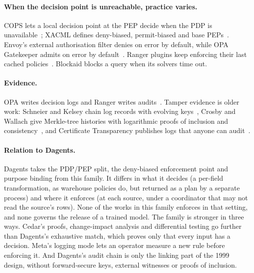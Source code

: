 \paragraph{When the decision point is unreachable, practice varies.} COPS lets a
local decision point at the PEP decide when the PDP is
unavailable~\citep{boyle2000cops}; XACML defines deny-biased, permit-biased and
base PEPs~\citep{oasis2013xacml}. Envoy's external authorisation filter denies
on error by default, while OPA Gatekeeper admits on error by
default~\citep{envoy2026extauthz,gatekeeper2026failing}. Ranger plugins keep
enforcing their last cached policies~\citep{cloudera2026rangerha}. Blockaid
blocks a query when its solvers time out.

\paragraph{Evidence.} OPA writes decision logs and Ranger writes
audits~\citep{opa2026decisionlogs}. Tamper evidence is older work: Schneier and
Kelsey chain log records with evolving keys~\citep{schneier1999secure}, Crosby
and Wallach give Merkle-tree histories with logarithmic proofs of inclusion and
consistency~\citep{crosby2009efficient}, and Certificate Transparency publishes
logs that anyone can audit~\citep{laurie2013certificate,laurie2021certificate}.

\paragraph{Relation to Dagents.} Dagents takes the PDP/PEP split, the
deny-biased enforcement point and purpose binding from this family. It differs
in what it decides (a per-field transformation, as warehouse policies do, but
returned as a plan by a separate process) and where it enforces (at each source,
under a coordinator that may not read the source's rows). None of the works in
this family enforces in that setting, and none governs the release of a trained
model. The family is stronger in three ways. Cedar's proofs, change-impact
analysis and differential testing go further than Dagents's exhaustive match,
which proves only that every input has a decision. Meta's logging mode lets an
operator measure a new rule before enforcing it. And Dagents's audit chain is
only the linking part of the 1999 design, without forward-secure keys, external
witnesses or proofs of inclusion.
